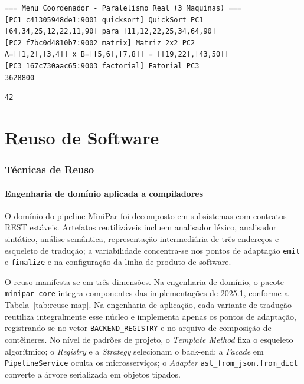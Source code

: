 \documentclass[12pt]{article}
\begin{document}
\begin{lstlisting}[caption={Saída do teste distribuído (\texttt{14\_distributed\_menu.minipar}, 15/jun/2026)},label={lst:evidence-distributed}]
=== Menu Coordenador - Paralelismo Real (3 Maquinas) ===
[PC1 c41305948de1:9001 quicksort] QuickSort PC1
[64,34,25,12,22,11,90] para [11,12,22,25,34,64,90]
[PC2 f7bc0d4810b7:9002 matrix] Matriz 2x2 PC2
A=[[1,2],[3,4]] x B=[[5,6],[7,8]] = [[19,22],[43,50]]
[PC3 167c730aac65:9003 factorial] Fatorial PC3
3628800
\end{lstlisting}

\begin{lstlisting}[caption={Saída do teste de canais (\texttt{15\_channels.minipar}, 15/jun/2026)},label={lst:evidence-channels}]
42
\end{lstlisting}

\part{Reuso de Software}

\section{Técnicas de Reuso}
\subsection{Engenharia de domínio aplicada a compiladores}
O domínio do pipeline MiniPar foi decomposto em subsistemas com contratos REST estáveis. Artefatos reutilizáveis incluem analisador léxico, analisador sintático, análise semântica, representação intermediária de três endereços e esqueleto de tradução; a variabilidade concentra-se nos pontos de adaptação \texttt{emit} e \texttt{finalize} e na configuração da linha de produto de software.

O reuso manifesta-se em três dimensões. Na engenharia de domínio, o pacote \texttt{minipar-core} integra componentes das implementações de 2025.1, conforme a Tabela~\ref{tab:reuse-map}. Na engenharia de aplicação, cada variante de tradução reutiliza integralmente esse núcleo e implementa apenas os pontos de adaptação, registrando-se no vetor \texttt{BACKEND\_REGISTRY} e no arquivo de composição de contêineres. No nível de padrões de projeto, o \emph{Template Method} fixa o esqueleto algorítmico; o \emph{Registry} e a \emph{Strategy} selecionam o back-end; a \emph{Facade} em \texttt{PipelineService} oculta os microsserviços; o \emph{Adapter} \texttt{ast\_from\_json.from\_dict} converte a árvore serializada em objetos tipados.
\end{document}
